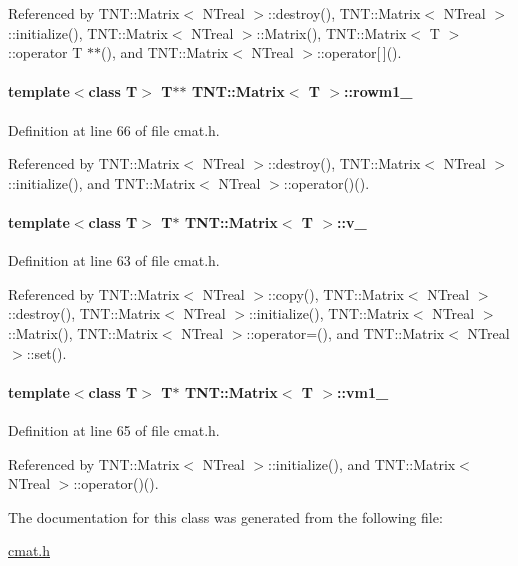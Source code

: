 Referenced by TNT::Matrix$<$ NTreal $>$::destroy(), TNT::Matrix$<$ NTreal $>$::initialize(), TNT::Matrix$<$ NTreal $>$::Matrix(), TNT::Matrix$<$ T $>$::operator T $\ast$$\ast$(), and TNT::Matrix$<$ NTreal $>$::operator\mbox{[}$\,$\mbox{]}().

\paragraph[{rowm1\_\-}]{\setlength{\rightskip}{0pt plus 5cm}template$<$class T$>$ T$\ast$$\ast$ {\bf TNT::Matrix}$<$ T $>$::{\bf rowm1\_\-}}\hfill\label{class_t_n_t_1_1_matrix_a099ebf68bd8eb98cda5844ca99dbf614}


Definition at line 66 of file cmat.h.



Referenced by TNT::Matrix$<$ NTreal $>$::destroy(), TNT::Matrix$<$ NTreal $>$::initialize(), and TNT::Matrix$<$ NTreal $>$::operator()().

\paragraph[{v\_\-}]{\setlength{\rightskip}{0pt plus 5cm}template$<$class T$>$ T$\ast$ {\bf TNT::Matrix}$<$ T $>$::{\bf v\_\-}}\hfill\label{class_t_n_t_1_1_matrix_a6a7ca17d4336b010fbde3036bbe54093}


Definition at line 63 of file cmat.h.



Referenced by TNT::Matrix$<$ NTreal $>$::copy(), TNT::Matrix$<$ NTreal $>$::destroy(), TNT::Matrix$<$ NTreal $>$::initialize(), TNT::Matrix$<$ NTreal $>$::Matrix(), TNT::Matrix$<$ NTreal $>$::operator=(), and TNT::Matrix$<$ NTreal $>$::set().

\paragraph[{vm1\_\-}]{\setlength{\rightskip}{0pt plus 5cm}template$<$class T$>$ T$\ast$ {\bf TNT::Matrix}$<$ T $>$::{\bf vm1\_\-}}\hfill\label{class_t_n_t_1_1_matrix_a7bee192ea8a850399382ff79c9d176bf}


Definition at line 65 of file cmat.h.



Referenced by TNT::Matrix$<$ NTreal $>$::initialize(), and TNT::Matrix$<$ NTreal $>$::operator()().



The documentation for this class was generated from the following file:\begin{DoxyCompactItemize}
\item 
\hyperlink{cmat_8h}{cmat.h}\end{DoxyCompactItemize}
